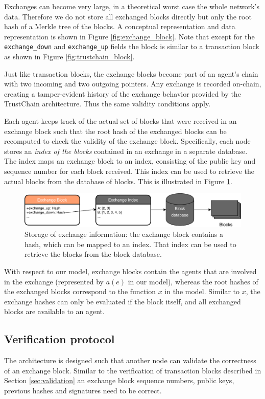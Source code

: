Exchanges can become very large, in a theoretical 
worst case the whole network's data. Therefore we do not store all exchanged blocks directly but only
the root hash of a Merkle tree of the blocks. A conceptual representation and data representation 
is shown in Figure \ref{fig:exchange_block}. Note that except for the \verb|exchange_down| and \verb|exchange_up|
fields the block is similar to a transaction block as shown in Figure \ref{fig:trustchain_block}. 

Just like transaction blocks, the exchange blocks become part of an agent's chain with two incoming
and two outgoing pointers. Any exchange is recorded on-chain, creating a tamper-evident history 
of the exchange behavior provided by the TrustChain architecture.
Thus the same validity conditions apply. 


Each agent keeps track of the actual set of blocks that were received in an exchange block such that 
the root hash of the exchanged blocks can be recomputed to check the validity of the exchange block. Specifically, each 
node stores an \textit{index of the blocks} contained in an exchange in a separate database. The 
index maps an exchange block to an index, consisting of the public key and sequence number for each
block received. This index can be 
used to retrieve the actual blocks from the database of blocks. This is illustrated in Figure \ref{fig:exchange_process}.

\begin{figure}
    \centering
    \includegraphics[width=\textwidth]{images/exchange_block_retrieval.pdf}
    \caption{Storage of exchange information: the exchange block contains a hash, which can be mapped to an index. That index can be used to retrieve the blocks from the block database.}
    \label{fig:exchange_process}
\end{figure}

With respect to our model, exchange blocks contain the agents that are involved in the exchange 
(represented by $a(e)$ in our model), whereas the root hashes of the exchanged blocks correspond to
the function $x$ in the model. Similar to $x$, the exchange hashes can only be evaluated if the 
block itself, and all exchanged blocks are available to an agent.

\subsection{Verification protocol}
The architecture is designed such that another node can validate the correctness of an exchange
block. Similar to the verification of transaction blocks described in Section \ref{sec:validation} an 
exchange block sequence numbers, public keys, previous hashes and signatures need to be correct. 

